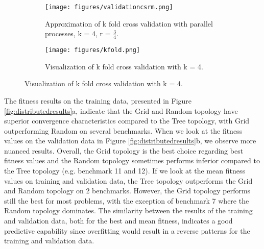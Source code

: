 \begin{figure}
	\begin{subfigure}{0.5\textwidth}\label{fig:csrmkfold}
    \texttt{[image: figures/validationcsrm.png]}
    \caption{Approximation of k fold cross validation with parallel processes, k = 4,  r = $\frac{3}{4}$.}
    \end{subfigure}
	\begin{subfigure}{0.5\textwidth}    \label{fig:kfold}

    \centering
    \texttt{[image: figures/kfold.png]}
    \caption{Visualization of k fold cross validation with k = 4.}
    \end{subfigure}%
    \label{fig:ckfold}
 \end{figure}

The fitness results on the training data, presented in Figure \ref{fig:distributedresults}a, indicate that the Grid and Random topology have superior convergence characteristics compared to the Tree topology, with Grid outperforming Random on several benchmarks. When we look at the fitness values on the validation data in Figure \ref{fig:distributedresults}b, we observe more nuanced results. Overall, the Grid topology is the best choice regarding best fitness values and the Random topology sometimes performs inferior compared to the Tree topology (e.g. benchmark 11 and 12). If we look at the mean fitness values on training and validation data, the Tree topology outperforms the Grid and Random topology on 2 benchmarks. However, the Grid topology performs still the best for most problems, with the exception of benchmark 7 where the Random topology dominates. The similarity between the results of the training and validation data, both for the best and mean fitness, indicates a good predictive capability since overfitting would result in a reverse patterns for the training and validation data.

